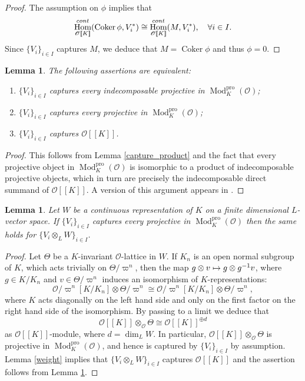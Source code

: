 \documentclass[11pt]{article}
\let\mathcal\mathscr
\newenvironment{enumeratei}
{\bgroup\def\theenumi{\roman{enumi}}\def\theenumii{\arabic{enumii}}\begin{enumerate}}
{\end{enumerate}\egroup}
\newcommand\mto{\mathchoice{\longmapsto}{\mapsto}{\mapsto}{\mapsto}}
\newtheorem{lem}[prop]{Lemma}
\theoremstyle{definition}
\DeclareMathOperator{\Hom}{Hom}
\DeclareMathOperator{\Coker}{Coker}
\DeclareMathOperator{\Mod}{Mod}
\newcommand{\br}[1]{[\![#1]\!]}
\newcommand{\cO}{\mathcal{O}}
\newcommand{\pro}{\mathrm{pro}}
\begin{document}
\begin{proof} The assumption on $\phi$ implies that\vspace*{-3pt}\enlargethispage{.5\baselineskip}%
\[
\Hom_{\cO\br{K}}^{\rm cont}(\Coker \phi, V_i^*)\cong \Hom_{\cO\br{K}}^{\rm cont}(M, V_i^*), \quad \forall i\in I.
\]
Since $\{V_i\}_{i\in I}$ captures $M$, we
deduce that $M=\Coker \phi$ and thus $\phi=0$.
\end{proof}

\begin{lem}\label{product} The following assertions are equivalent:
\begin{enumeratei}
\item
$\{V_i\}_{i\in I}$ captures every indecomposable projective in $\Mod^{\pro}_{K}(\cO)$;
\item
$\{V_i\}_{i\in I}$ captures every projective in $\Mod^{\pro}_{K}(\cO)$;
\item
$\{V_i\}_{i\in I}$ captures $\cO\br{K}$.
\end{enumeratei}
\end{lem}

\begin{proof} This follows from Lemma \ref{capture_product} and the fact that every projective object in $\Mod^{\pro}_K(\cO)$ is isomorphic to a product of indecomposable projective objects, which in turn are precisely the indecomposable
direct summand of $\cO\br{K}$. A version of this argument appears in \cite[Lem.\,2.11]{CDP}.
\end{proof}

\begin{lem}\label{weight_proj} Let $W$ be a continuous representation of $K$ on a finite dimensional $L$-vector space. If $\{V_i\}_{i\in I}$ captures every projective in $\Mod^{\pro}_{K}(\cO)$
then the same holds for $\{V_i \otimes_L W\}_{i\in I}$.
\end{lem}

\begin{proof} Let $\Theta$ be a $K$-invariant $\cO$-lattice in $W$. If $K_n$ is an open normal subgroup of $K$, which acts trivially on $\Theta/\varpi^n$, then
the map $g \otimes v \mto g \otimes g^{-1} v$, where $g\in K/K_n$ and $v \in \Theta/\varpi^n$ induces an isomorphism of $K$-representations:
\[
\cO/\varpi^n [ K/K_n] \otimes \Theta/\varpi^n \cong \cO/\varpi^n [ K/K_n] \otimes \Theta/\varpi^n,
\]
where $K$ acts diagonally on the left hand side and only on the first factor on the right hand side of the isomorphism. By passing to a limit we deduce that
\[
\cO\br{K}\otimes_{\cO} \Theta\cong \cO\br{K}^{\oplus d}
\]
as $\cO\br{K}$-module, where $d=\dim_L W$.
In particular, $\cO\br{K}\otimes_{\cO} \Theta$ is projective in $\Mod^{\pro}_{K}(\cO)$, and hence is captured by $\{V_i\}_{i\in I}$ by assumption. Lemma \ref{weight} implies that
$\{V_i\otimes_L W\}_{i \in I}$ captures $\cO\br{K}$ and the assertion follows from Lemma \ref{product}.
\end{proof}
\end{document}
